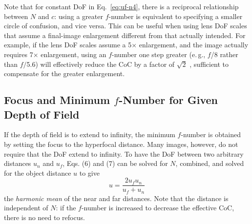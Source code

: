 \documentclass[11pt, oneside]{scrartcl}   	%
\begin{document}
Note that for constant DoF in Eq.~\ref{eq:uf-n4}, there is a reciprocal relationship between $N$ and
$c$: using a greater $f$-number is equivalent to specifying a smaller circle of confusion, and vice versa. This can be useful when using lens DoF scales that assume a final-image enlargement different from that actually intended. For example, if the lens DoF scales assume a 5× enlargement, and the image actually requires 7× enlargement, using an $f$-number one step greater (e.\,g., $f$/8 rather than $f/$5.6) will effectively reduce the CoC by a factor of $\sqrt 2$ , sufficient to compensate for the greater enlargement.
\subsection{Focus and Minimum $f$-Number for Given Depth of Field}

If the depth of field is to extend to infinity, the minimum $f$-number
is obtained by setting the focus to the hyperfocal distance. Many
images, however, do not require that the DoF extend to infinity. To
have the DoF between two arbitrary distances $u_n$ and $u_f$, Eqs. (6)
and (7) can be solved for $N$, combined, and solved for the object
distance $u$ to give
\begin{equation}
  \label{eq:u}
  u = \frac{2u_fu_n}{u_f+u_n}
\end{equation}
the \emph{harmonic mean} of the near and far distances. Note that the distance is independent of $N$: if the $f$-number is increased to decrease the effective CoC, there is no need to refocus.
\end{document}
